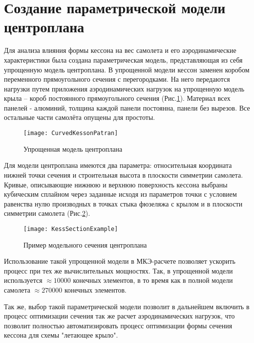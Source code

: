 \section{Создание параметрической модели центроплана}

Для анализа влияния формы кессона на вес самолета и его аэродинамические характеристики была создана параметрическая модель, представляющая из себя упрощенную модель центроплана. В упрощенной модели кессон заменен коробом переменного прямоугольного сечения с перегородками. На него передаются нагрузки путем приложения аэродинамических нагрузок на упрощенную модель крыла -- короб постоянного прямоугольного сечения (Рис.\ref{fig:CurvedKessonPatran}). Материал всех панелей - алюминий, толщина каждой панели постоянна, панели без вырезов. Все остальные части самолёта опущены для простоты.  

\begin{figure}[ht]
\centering
\texttt{[image: CurvedKessonPatran]}
\caption{Упрощенная модель центроплана}
\label{fig:CurvedKessonPatran}
\end{figure}

Для модели центроплана имеются два параметра: относительная координата нижней точки сечения и строительная высота в плоскости симметрии самолета. Кривые, описывающие нижнюю и верхнюю поверхность кессона выбраны кубическим сплайном через заданные исходя из параметров точки с условием равенства нулю производных в точках стыка фюзеляжа с крылом и в плоскости симметрии самолета (Рис.\ref{fig:KessSectionExample}).

\begin{figure}[ht]
\centering
\texttt{[image: KessSectionExample]}
\caption{Пример модельного сечения центроплана}
\label{fig:KessSectionExample}
\end{figure}

Использование такой упрощенной модели в МКЭ-расчете позволяет ускорить процесс при тех же вычислительных мощностях. Так, в упрощенной модели используется $\approx10000$ конечных элементов, в то время как в полной модели самолета $\approx270000$ конечных элементов.

Так же, выбор такой параметрической модели позволит в дальнейшем включить в процесс оптимизации сечения так же расчет аэродинамических нагрузок, что позволит полностью автоматизировать процесс оптимизации формы сечения кессона для схемы "летающее крыло". 

